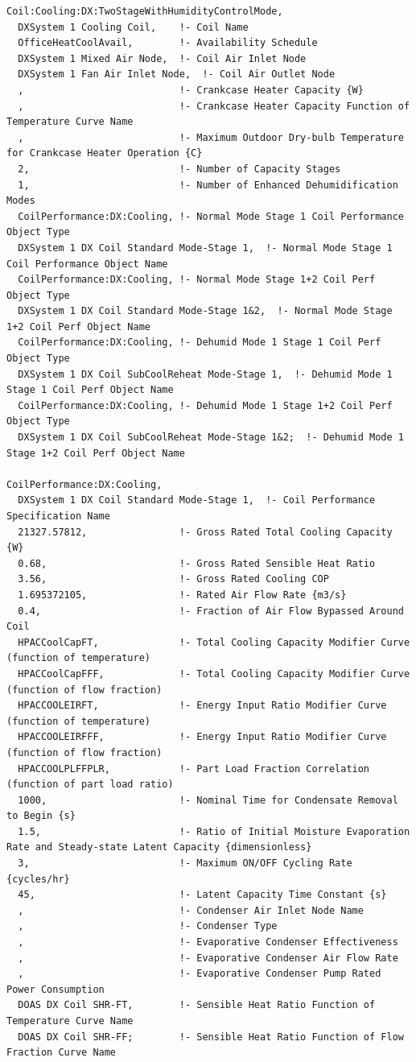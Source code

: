 \begin{lstlisting}
Coil:Cooling:DX:TwoStageWithHumidityControlMode,
  DXSystem 1 Cooling Coil,    !- Coil Name
  OfficeHeatCoolAvail,        !- Availability Schedule
  DXSystem 1 Mixed Air Node,  !- Coil Air Inlet Node
  DXSystem 1 Fan Air Inlet Node,  !- Coil Air Outlet Node
  ,                           !- Crankcase Heater Capacity {W}
  ,                           !- Crankcase Heater Capacity Function of Temperature Curve Name
  ,                           !- Maximum Outdoor Dry-bulb Temperature for Crankcase Heater Operation {C}
  2,                          !- Number of Capacity Stages
  1,                          !- Number of Enhanced Dehumidification Modes
  CoilPerformance:DX:Cooling, !- Normal Mode Stage 1 Coil Performance Object Type
  DXSystem 1 DX Coil Standard Mode-Stage 1,  !- Normal Mode Stage 1 Coil Performance Object Name
  CoilPerformance:DX:Cooling, !- Normal Mode Stage 1+2 Coil Perf Object Type
  DXSystem 1 DX Coil Standard Mode-Stage 1&2,  !- Normal Mode Stage 1+2 Coil Perf Object Name
  CoilPerformance:DX:Cooling, !- Dehumid Mode 1 Stage 1 Coil Perf Object Type
  DXSystem 1 DX Coil SubCoolReheat Mode-Stage 1,  !- Dehumid Mode 1 Stage 1 Coil Perf Object Name
  CoilPerformance:DX:Cooling, !- Dehumid Mode 1 Stage 1+2 Coil Perf Object Type
  DXSystem 1 DX Coil SubCoolReheat Mode-Stage 1&2;  !- Dehumid Mode 1 Stage 1+2 Coil Perf Object Name

CoilPerformance:DX:Cooling,
  DXSystem 1 DX Coil Standard Mode-Stage 1,  !- Coil Performance Specification Name
  21327.57812,                !- Gross Rated Total Cooling Capacity {W}
  0.68,                       !- Gross Rated Sensible Heat Ratio
  3.56,                       !- Gross Rated Cooling COP
  1.695372105,                !- Rated Air Flow Rate {m3/s}
  0.4,                        !- Fraction of Air Flow Bypassed Around Coil
  HPACCoolCapFT,              !- Total Cooling Capacity Modifier Curve (function of temperature)
  HPACCoolCapFFF,             !- Total Cooling Capacity Modifier Curve (function of flow fraction)
  HPACCOOLEIRFT,              !- Energy Input Ratio Modifier Curve (function of temperature)
  HPACCOOLEIRFFF,             !- Energy Input Ratio Modifier Curve (function of flow fraction)
  HPACCOOLPLFFPLR,            !- Part Load Fraction Correlation (function of part load ratio)
  1000,                       !- Nominal Time for Condensate Removal to Begin {s}
  1.5,                        !- Ratio of Initial Moisture Evaporation Rate and Steady-state Latent Capacity {dimensionless}
  3,                          !- Maximum ON/OFF Cycling Rate {cycles/hr}
  45,                         !- Latent Capacity Time Constant {s}
  ,                           !- Condenser Air Inlet Node Name
  ,                           !- Condenser Type
  ,                           !- Evaporative Condenser Effectiveness
  ,                           !- Evaporative Condenser Air Flow Rate
  ,                           !- Evaporative Condenser Pump Rated Power Consumption
  DOAS DX Coil SHR-FT,        !- Sensible Heat Ratio Function of Temperature Curve Name
  DOAS DX Coil SHR-FF;        !- Sensible Heat Ratio Function of Flow Fraction Curve Name


\end{lstlisting}

